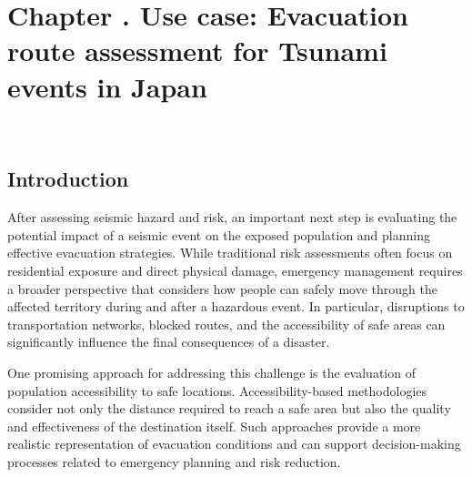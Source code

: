 \graphicspath{
    {figures_and_references/evacuation_japan/}
}

\renewcommand{\chapternametext}{Chapter \thechapter . Use case: Evacuation route assessment for Tsunami events in Japan}
\renewcommand{\shortchapternametext}{Chapter \thechapter . Use case: Evacuation route assessment}


\chapter{\chapternametext}
\

\renewcommand{\headingtextL}{}
\renewcommand{\headingtextR}{\shortchapternametext}
\begingroup
 \flushbottom
 \setlength{\parskip}{0pt plus 1fil}%
 \localtableofcontents 
\endgroup

\begingroup
 \flushbottom
 \setlength{\parskip}{0pt plus 1fil}%
 \locallistoffigures
 \locallistoftables
\endgroup


\newpage

\setcounter{section}{0} 

\FloatBarrier

\renewcommand{\sectionnametext}{Introduction}
\renewcommand{\headingtextL}{\shortchapternametext}
\renewcommand{\headingtextR}{\thesection. \sectionnametext}
\section{\sectionnametext}

After assessing seismic hazard and risk, an important next step is evaluating the potential impact of a seismic event on the exposed population and planning effective evacuation strategies. While traditional risk assessments often focus on residential exposure and direct physical damage, emergency management requires a broader perspective that considers how people can safely move through the affected territory during and after a hazardous event. In particular, disruptions to transportation networks, blocked routes, and the accessibility of safe areas can significantly influence the final consequences of a disaster.

One promising approach for addressing this challenge is the evaluation of population accessibility to safe locations. Accessibility-based methodologies consider not only the distance required to reach a safe area but also the quality and effectiveness of the destination itself. Such approaches provide a more realistic representation of evacuation conditions and can support decision-making processes related to emergency planning and risk reduction.

